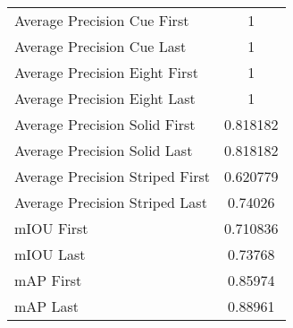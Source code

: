 \begin{figure}
\begin{subfigure}[b]{0.49\textwidth}
\begin{tabular}{|l|c|}
    \hline
    Average Precision Cue First & 1 \\
    Average Precision Cue Last & 1 \\
    Average Precision Eight First & 1 \\
    Average Precision Eight Last & 1 \\
    Average Precision Solid First & 0.818182 \\
    Average Precision Solid Last & 0.818182 \\
    Average Precision Striped First & 0.620779 \\
    Average Precision Striped Last & 0.74026 \\
    \hline
    mIOU First & 0.710836 \\
    mIOU Last & 0.73768 \\
    mAP First & 0.85974 \\
    mAP Last & 0.88961 \\
    \hline
\end{tabular}
\end{subfigure}
\end{figure}

